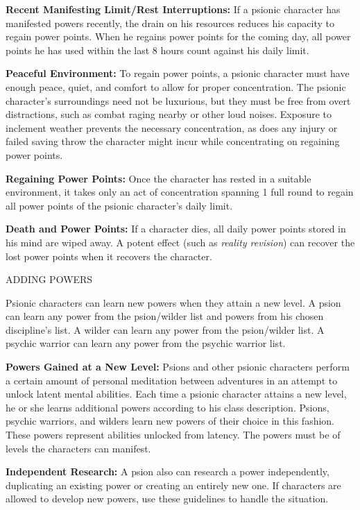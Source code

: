 \documentclass{article}
\begin{document}
\textbf{Recent Manifesting Limit/Rest Interruptions:} If a psionic character has 
manifested powers recently, the drain on his resources reduces his capacity to 
regain power points. When he regains power points for the coming day, all power 
points he has used within the last 8 hours count against his daily limit.

\textbf{Peaceful Environment: }To regain power points, a psionic character must 
have enough peace, quiet, and comfort to allow for proper concentration. The psionic 
character's surroundings need not be luxurious, but they must be free from overt 
distractions, such as combat raging nearby or other loud noises. Exposure to inclement 
weather prevents the necessary concentration, as does any injury or failed saving 
throw the character might incur while concentrating on regaining power points.

\textbf{Regaining Power Points:} Once the character has rested in a suitable environment, 
it takes only an act of concentration spanning 1 full round to regain all power 
points of the psionic character's daily limit. 

\textbf{Death and Power Points:} If a character dies, all daily power points stored 
in his mind are wiped away. A potent effect (such as \textit{reality revision}) 
can recover the lost power points when it recovers the character.

\vspace{12pt}
ADDING POWERS

Psionic characters can learn new powers when they attain a new level. A psion can 
learn any power from the psion/wilder list and powers from his chosen discipline's 
list. A wilder can learn any power from the psion/wilder list. A psychic warrior 
can learn any power from the psychic warrior list. 

\textbf{Powers Gained at a New Level: }Psions and other psionic characters perform 
a certain amount of personal meditation between adventures in an attempt to unlock 
latent mental abilities. Each time a psionic character attains a new level, he 
or she learns additional powers according to his class description. Psions, psychic 
warriors, and wilders learn new powers of their choice in this fashion. These powers 
represent abilities unlocked from latency. The powers must be of levels the characters 
can manifest.

\textbf{Independent Research:} A psion also can research a power independently, 
duplicating an existing power or creating an entirely new one. If characters are 
allowed to develop new powers, use these guidelines to handle the situation.
\end{document}

